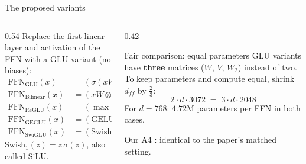 \documentclass[aspectratio=169,11pt]{beamer}
\begin{document}
\begin{frame}{The proposed variants}
  \begin{columns}[T]
    \begin{column}{0.54\textwidth}
      \small
      Replace the first linear layer and activation of the FFN with a GLU variant (no biases):
      \begin{align*}
        \text{FFN}_{\text{GLU}}(x)&=(\sigma(xW)\otimes xV)\,W_2\\
        \text{FFN}_{\text{Bilinear}}(x)&=(xW\otimes xV)\,W_2\\
        \text{FFN}_{\text{ReGLU}}(x)&=(\max(0,xW)\otimes xV)\,W_2\\
        \text{FFN}_{\text{GEGLU}}(x)&=(\text{GELU}(xW)\otimes xV)\,W_2\\
        \text{FFN}_{\text{SwiGLU}}(x)&=(\text{Swish}_1(xW)\otimes xV)\,W_2
      \end{align*}
      $\text{Swish}_1(z)=z\,\sigma(z)$, also called SiLU.
    \end{column}
    \begin{column}{0.42\textwidth}
      \begin{block}{Fair comparison: equal parameters}
        \small
        GLU variants have \textbf{three} matrices ($W$, $V$, $W_2$) instead of two.
        To keep parameters and compute equal, shrink $d_{ff}$ by $\tfrac23$:
        \[
          2\cdot d\cdot 3072 \;=\; 3\cdot d\cdot 2048
        \]
        For $d=768$: $4.72$M parameters per FFN in both cases.
      \end{block}
      \begin{exampleblock}{Our A4}
        \small
        : identical to the paper's matched setting.
      \end{exampleblock}
    \end{column}
  \end{columns}
\end{frame}
\end{document}
